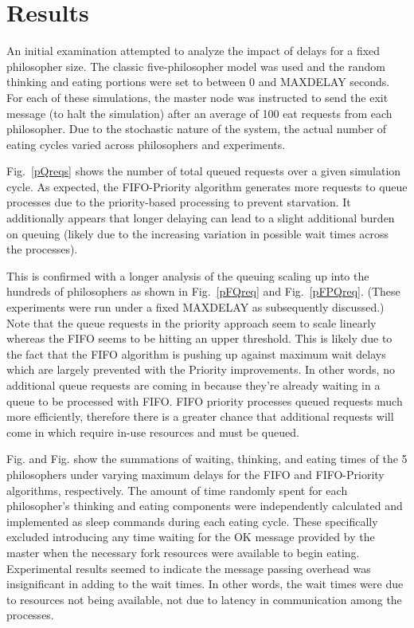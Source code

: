 \documentclass[conference,11pt]{IEEEtran}
\begin{document}
\section{Results}
An initial examination attempted to analyze the impact of delays for a fixed philosopher size. The classic five-philosopher model was used and the random thinking and eating portions were set to between 0 and MAXDELAY seconds. For each of these simulations, the master node was instructed to send the exit message (to halt the simulation) after an average of 100 eat requests from each philosopher. Due to the stochastic nature of the system, the actual number of eating cycles varied across philosophers and experiments.

Fig.~\ref{pQreqs} shows the number of total queued requests over a given simulation cycle. As expected, the FIFO-Priority algorithm generates more requests to queue processes due to the priority-based processing to prevent starvation. It additionally appears that longer delaying can lead to a slight additional burden on queuing (likely due to the increasing variation in possible wait times across the processes).

This is confirmed with a longer analysis of the queuing scaling up into the hundreds of philosophers as shown in Fig.~\ref{pFQreq} and Fig.~\ref{pFPQreq}. (These experiments were run under a fixed MAXDELAY as subsequently discussed.) Note that the queue requests in the priority approach seem to scale linearly whereas the FIFO seems to be hitting an upper threshold. This is likely due to the fact that the FIFO algorithm is pushing up against maximum wait delays which are largely prevented with the Priority improvements. In other words, no additional queue requests are coming in because they're already waiting in a queue to be processed with FIFO. FIFO priority processes queued requests much more efficiently, therefore there is a greater chance that additional requests will come in which require in-use resources and must be queued.

Fig. and Fig. show the summations of waiting, thinking, and eating times of the 5 philosophers under varying maximum delays for the FIFO and FIFO-Priority algorithms, respectively. The amount of time randomly spent for each philosopher's thinking and eating components were independently calculated and implemented as sleep commands during each eating cycle. These specifically excluded introducing any time waiting for the OK message provided by the master when the necessary fork resources were available to begin eating. Experimental results seemed to indicate the message passing overhead was insignificant in adding to the wait times. In other words, the wait times were due to resources not being available, not due to latency in communication among the processes.
\end{document}

